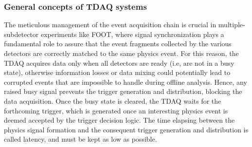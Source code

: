 \subsubsection{General concepts of TDAQ systems}\label{ssec:tdaq_general_info}
The meticulous management of the event acquisition chain is crucial in multiple-subdetector experiments like FOOT, where signal synchronization plays a fundamental role to assure that the event fragments collected by the various detectors are correctly matched to the same physics event. For this reason, the TDAQ acquires data only when all detectors are ready (i.e, are not in a busy state), otherwise information losses or data mixing could potentially lead to corrupted events that are impossible to handle during offline analysis. Hence, any raised busy signal prevents the trigger generation and distribution, blocking the data acquisition. Once the busy state is cleared, the TDAQ waits for the forthcoming trigger, which is generated once an interesting physics event is deemed accepted by the trigger decision logic. The time elapsing between the physics signal formation and the consequent trigger generation and distribution is called latency, and must be kept as low as possible.


